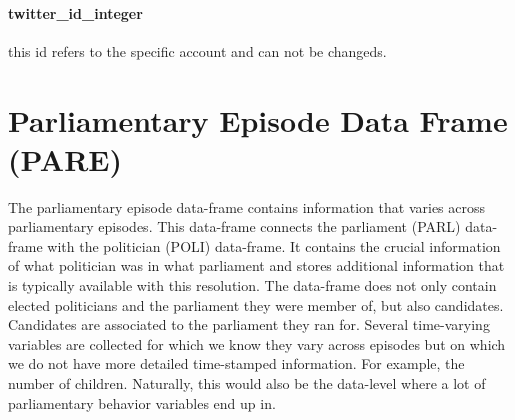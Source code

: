 \documentclass{article}
\begin{document}
    \paragraph{twitter\_id\_integer }
     this id refers to the specific account and can not be changeds.

\section{Parliamentary Episode Data Frame (\gls{PARE})}\label{PARE}
    The parliamentary episode data-frame contains information that varies across parliamentary episodes. This data-frame connects the parliament (PARL) data-frame with the politician (POLI) data-frame. It contains the crucial information of what politician was in what parliament and stores additional information that is typically available with this resolution. The data-frame does not only contain elected politicians and the parliament they were member of, but also candidates. Candidates are associated to the parliament they ran for. Several time-varying variables are collected for which we know they vary across episodes but on which we do not have more detailed time-stamped information. For example, the number of children. Naturally, this would also be the data-level where a lot of parliamentary behavior variables end up in.
    
\end{document}
